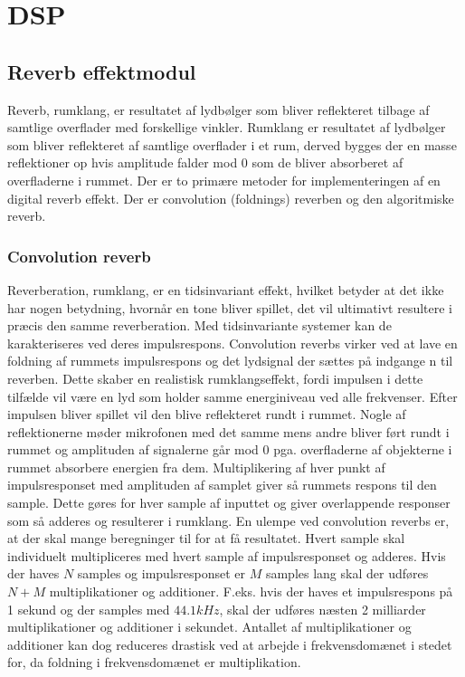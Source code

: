 \chapter{DSP}\label{chap:DSP}


\section{Reverb effektmodul}\label{sec:reverb}
Reverb, rumklang, er resultatet af lydbølger som bliver reflekteret tilbage af samtlige overflader med forskellige vinkler.\newline
Rumklang er resultatet af lydbølger som bliver reflekteret af samtlige overflader i et rum, derved bygges der en masse reflektioner op hvis amplitude falder mod $0$ som de bliver absorberet af overfladerne i rummet.\newline
Der er to primære metoder for implementeringen af en digital reverb effekt.
Der er convolution (foldnings) reverben og den algoritmiske reverb.
\subsection{Convolution reverb}
Reverberation, rumklang, er en tidsinvariant effekt, hvilket betyder at det ikke har nogen betydning, hvornår en tone bliver spillet, det vil ultimativt resultere i præcis den samme reverberation. \newline
Med tidsinvariante systemer kan de karakteriseres ved deres impulsrespons.
Convolution reverbs virker ved at lave en foldning af rummets impulsrespons og det lydsignal der sættes på indgange n til reverben.\newline
Dette skaber en realistisk rumklangseffekt, fordi impulsen i dette tilfælde vil være en lyd som holder samme energiniveau ved alle frekvenser.
Efter impulsen bliver spillet vil den blive reflekteret rundt i rummet.
Nogle af reflektionerne møder mikrofonen med det samme mens andre bliver ført rundt i rummet og amplituden af signalerne går mod $0$ pga. overfladerne af objekterne i rummet absorbere energien fra dem.\newline
Multiplikering af hver punkt af impulsresponset med amplituden af samplet giver så rummets respons til den sample.
Dette gøres for hver sample af inputtet og giver overlappende responser som så adderes og resulterer i rumklang.
En ulempe ved convolution reverbs er, at der skal mange beregninger til for at få resultatet.
Hvert sample skal individuelt multipliceres med hvert sample af impulsresponset og adderes.
Hvis der haves $N$ samples og impulsresponset er $M$ samples lang skal der udføres $N+M$ multiplikationer og additioner.
F.eks. hvis der haves et impulsrespons på 1 sekund og der samples med $44.1\si{kHz}$, skal der udføres næsten 2 milliarder multiplikationer og additioner i sekundet.
Antallet af multiplikationer og additioner kan dog reduceres drastisk ved at arbejde i frekvensdomænet i stedet for, da foldning i frekvensdomænet er multiplikation.

